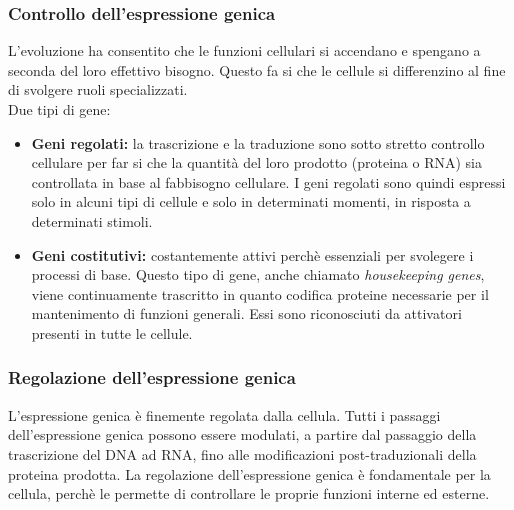 \documentclass[hyperref={pdfpagelabels=false}]{beamer}
\begin{document}
\begin{frame}\frametitle{Controllo dell'espressione genica}
L'evoluzione ha consentito che le funzioni cellulari si accendano e spengano a seconda del loro effettivo bisogno. Questo fa si che le cellule si differenzino al fine di svolgere ruoli specializzati.
\\
Due tipi di gene:
\begin{itemize}
\item \textbf{Geni regolati:} la trascrizione e la traduzione sono sotto stretto controllo cellulare per far si che la quantit\`a del loro prodotto (proteina o RNA) sia controllata in base al fabbisogno cellulare. I geni regolati sono quindi espressi solo in alcuni tipi di cellule e solo in determinati momenti, in risposta a determinati stimoli.
\item \textbf{Geni costitutivi:} costantemente attivi perch\`e essenziali per svolegere i processi di base. Questo tipo di gene, anche chiamato \emph{housekeeping genes}, viene continuamente trascritto in quanto codifica proteine necessarie per il mantenimento di funzioni generali. Essi sono riconosciuti da attivatori  presenti in tutte le 
cellule.
\end{itemize}
\end{frame}


\begin{frame}\frametitle{Regolazione dell'espressione genica}
L'espressione genica \`e finemente regolata dalla cellula. Tutti i passaggi dell'espressione genica possono essere modulati, a partire dal passaggio della trascrizione del DNA ad RNA, fino alle modificazioni post-traduzionali della proteina prodotta. La regolazione dell'espressione genica \`e fondamentale per la cellula, perch\`e le permette di controllare le proprie funzioni interne ed esterne.
\end{frame}
\end{document}
